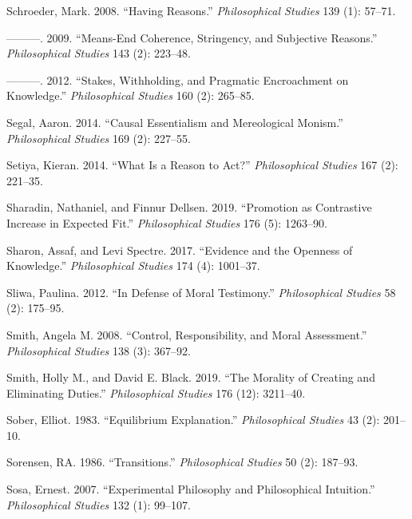 \documentclass[
  10pt,
  letterpaper,
  DIV=11,
  numbers=noendperiod,
  twoside]{scrartcl}
\newlength{\cslhangindent}
\newenvironment{CSLReferences}[2] %
 {\begin{list}{}{%
  \setlength{\itemindent}{0pt}
  \setlength{\leftmargin}{0pt}
  \setlength{\parsep}{0pt}
  \ifodd #1
   \setlength{\leftmargin}{\cslhangindent}
   \setlength{\itemindent}{-1\cslhangindent}
  \fi
  \setlength{\itemsep}{#2\baselineskip}}}
 {\end{list}}
\begin{document}
\begin{CSLReferences}{1}{0}
Schroeder, Mark. 2008. {``Having Reasons.''} \emph{Philosophical
Studies} 139 (1): 57--71.

---------. 2009. {``Means-End Coherence, Stringency, and Subjective
Reasons.''} \emph{Philosophical Studies} 143 (2): 223--48.

---------. 2012. {``Stakes, Withholding, and Pragmatic Encroachment on
Knowledge.''} \emph{Philosophical Studies} 160 (2): 265--85.

Segal, Aaron. 2014. {``Causal Essentialism and Mereological Monism.''}
\emph{Philosophical Studies} 169 (2): 227--55.

Setiya, Kieran. 2014. {``What Is a Reason to Act?''} \emph{Philosophical
Studies} 167 (2): 221--35.

Sharadin, Nathaniel, and Finnur Dellsen. 2019. {``Promotion as
Contrastive Increase in Expected Fit.''} \emph{Philosophical Studies}
176 (5): 1263--90.

Sharon, Assaf, and Levi Spectre. 2017. {``Evidence and the Openness of
Knowledge.''} \emph{Philosophical Studies} 174 (4): 1001--37.

Sliwa, Paulina. 2012. {``In Defense of Moral Testimony.''}
\emph{Philosophical Studies} 58 (2): 175--95.

Smith, Angela M. 2008. {``Control, Responsibility, and Moral
Assessment.''} \emph{Philosophical Studies} 138 (3): 367--92.

Smith, Holly M., and David E. Black. 2019. {``The Morality of Creating
and Eliminating Duties.''} \emph{Philosophical Studies} 176 (12):
3211--40.

Sober, Elliot. 1983. {``Equilibrium Explanation.''} \emph{Philosophical
Studies} 43 (2): 201--10.

Sorensen, RA. 1986. {``Transitions.''} \emph{Philosophical Studies} 50
(2): 187--93.

Sosa, Ernest. 2007. {``Experimental Philosophy and Philosophical
Intuition.''} \emph{Philosophical Studies} 132 (1): 99--107.


\end{CSLReferences}
\end{document}
